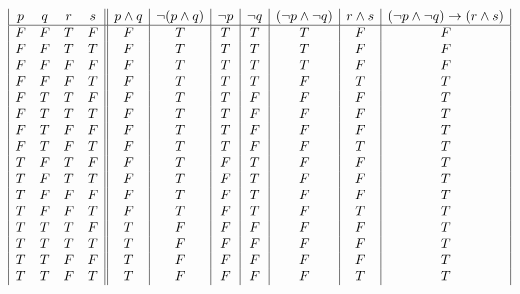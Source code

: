 \documentclass[11pt,a4paper]{article}
\begin{document}
\begin{enumerate}
\begin{center}
\end{center}

\begin{displaymath}
\begin{array}{|c c c c||c|c|c|c|c|c|c|}
p & q & r & s & p \wedge q & \neg(p \wedge q) & \neg p & \neg q & (\neg p \wedge \neg q) & r \wedge s & (\neg p \wedge \neg q) \rightarrow (r \wedge s) \\
\hline 
F & F & T & F & F & T & T & T & T & F & F\\
F & F & T & T & F & T & T & T & T & F & F\\
F & F & F & F & F & T & T & T & T & F & F\\
F & F & F & T & F & T & T & T & F & T & T\\
F & T & T & F & F & T & T & F & F & F & T\\
F & T & T & T & F & T & T & F & F & F & T\\
F & T & F & F & F & T & T & F & F & F & T\\
F & T & F & T & F & T & T & F & F & T & T\\
T & F & T & F & F & T & F & T & F & F & T\\
T & F & T & T & F & T & F & T & F & F & T\\
T & F & F & F & F & T & F & T & F & F & T\\
T & F & F & T & F & T & F & T & F & T & T\\
T & T & T & F & T & F & F & F & F & F & T\\
T & T & T & T & T & F & F & F & F & F & T\\
T & T & F & F & T & F & F & F & F & F & T\\
T & T & F & T & T & F & F & F & F & T & T\\
\end{array}
\end{displaymath}







\end{enumerate}
\end{document}

